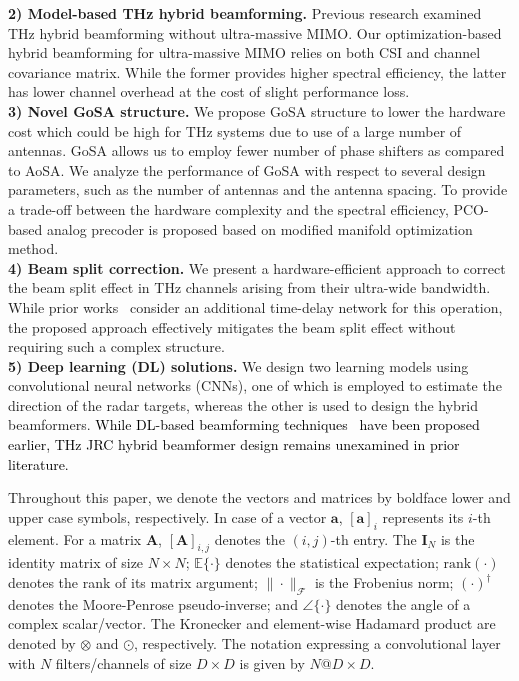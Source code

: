 \documentclass[journal,10pt]{IEEEtran}
\begin{document}
	\textbf{2) Model-based THz hybrid beamforming.} Previous research \cite{busari2019generalized,yuan2020hybrid,ning2021terahertz} examined THz hybrid beamforming without ultra-massive MIMO. Our optimization-based hybrid beamforming for ultra-massive MIMO relies on both CSI and channel covariance matrix. While the former provides higher spectral efficiency, the latter has lower channel overhead at the cost of slight performance loss.\\
	\textbf{3) Novel GoSA structure.} We propose GoSA structure to lower the hardware cost which could be high for THz systems due to use of a large number of antennas. GoSA allows us to employ fewer number of phase shifters as compared to AoSA. We analyze the performance of GoSA with respect to several design parameters, such as the number of antennas and the antenna spacing. To provide a trade-off between the hardware complexity and the spectral efficiency, PCO-based analog precoder is proposed based on modified manifold optimization method.\\
	{\color{black}\textbf{4) Beam split correction.} We present a hardware-efficient approach to correct the beam split effect in THz channels arising from their ultra-wide bandwidth. While prior works~\cite{thz_beamSplit,thz_beamSplitConf} consider an additional time-delay network for this operation, the proposed approach effectively mitigates the beam split effect without requiring such a complex structure.} \\
	\textbf{5) Deep learning (DL) solutions.} We design two learning models using convolutional neural networks (CNNs), one of which is employed to estimate the direction of the radar targets, whereas the other is used to design the hybrid beamformers. \textcolor{black}{While DL-based beamforming techniques~\cite{elbirQuantizedCNN2019,elbir2019online} have been proposed earlier, THz JRC hybrid beamformer design remains unexamined in prior literature.}  
	
	Throughout this paper, we denote the vectors and matrices by boldface lower and upper case symbols, respectively. In case of a vector $\mathbf{a}$, $[\mathbf{a}]_{i}$ represents its $i$-th element. For a matrix $\mathbf{A}$, $[\mathbf{A}]_{i,j}$ denotes the $(i,j)$-th entry. The $\mathbf{I}_N$ is the identity matrix of size $N\times N$; $\mathbb{E}\{\cdot\}$ denotes the statistical expectation; $\textrm{rank}(\cdot)$ denotes the rank of its matrix argument; $\|\cdot\|_\mathcal{F}$ is the Frobenius norm; $(\cdot)^{\dagger}$ denotes the Moore-Penrose pseudo-inverse; and $\angle\{\cdot\}$ denotes the angle of a complex scalar/vector. The Kronecker and element-wise Hadamard product are denoted by $\otimes$ and  $\odot$,  respectively. The notation expressing a convolutional layer with $N$ filters/channels of size $D\times D$ is given by  $N$@$ D\times D$.
	
\end{document}
